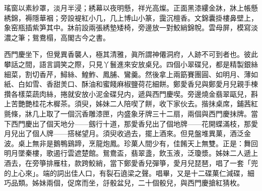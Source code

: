 \begin{myquote}
瑤窗以素紗罩，淡月半浸；綉幕以夜明懸，祥光高燦。正面黑漆縷金牀，牀上帳懸綉錦，褥隱華裀；旁設褆紅小几，几上博山小篆，靄沉檀香。文錦囊掛樓鼻壁上，象窑瓶插紫笋其中。牀前設兩張綉墊矮椅，旁邊放一對鮫綃錦帨。雲母屏，模寫淡濃之筆；鴛鴦榻，高閣古今之書。
\end{myquote}

西門慶坐下，但覺異香襲人，極其清雅，眞所謂神僊洞府，人跡不可到者也。彼此攀話之間，語言調笑之際，只見丫鬟進來安放桌兒。四個小翠碟兒，都是精製銀絲細菜，割切香芹，鱘絲、鰉鮓、鳳脯、鸞羹。然後拿上兩筯賽團圓、如明月、薄如紙、白如雪、香甜羙口、酥油和蜜餞麻椒鹽荷花細餅。鄭愛香兒與鄭愛月兒親手楝攢各樣菜蔬肉絲，捲就安放小泥金碟兒内，遞與西門慶喫。旁邊燒金翡翠甌兒，斟上苦艷艷桂花木樨茶。須臾，姊妹二人陪喫了餅，收下家伙去。揩抹桌席，鋪茜紅氈條，牀几上取了一個沉香雕漆匣，内盛象牙牌三十二扇，兩個與西門慶抹牌。當下西門慶出了個天地分——劔行十道，那愛香兒出了個地牌——花開蝶滿枝，那愛月兒出了個人牌——搭梯望月。須臾收過去，擺上酒來。但見盤堆異菓，酒泛金波。桌上無非是鵝鴨鷄蹄，烹龍炮鳳。珍菓人間少有，佳餚天上無雙。正是：舞回明月墜秦樓，歌遏行雲遮楚館。鴛鴦盃，翡翠盞，飲玉液，泛瓊漿。姊妹二人遞上酒去，在旁箏排雁柱，款跨鮫綃，當下鄭愛香兒彈箏，愛月兒琵琶，唱了一套「兜的上心來」。端的詞出佳人口，有裂石遶梁之聲。唱畢，又是十二碟菓仁減碟，細巧品類。姊妹兩個，促席而坐，㧱骰盆兒，二十個骰兒，與西門慶搶紅猜枚。

